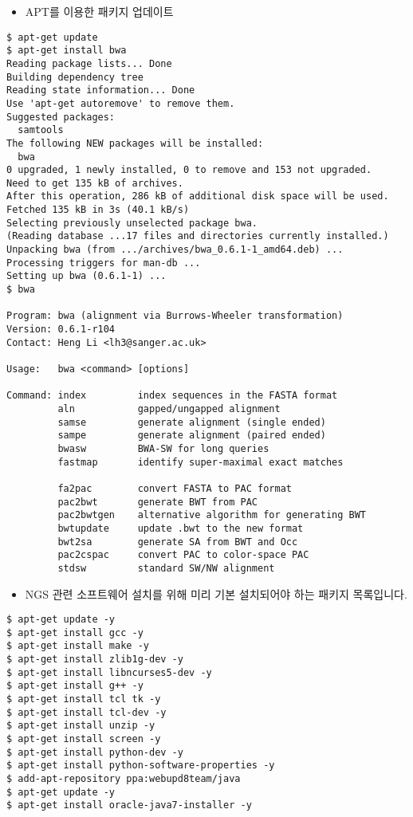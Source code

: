 \documentclass{article}
\begin{document}
\begin{itemize}
\item
  \begin{itemize}
  APT를 이용한 패키지 업데이트  
  \end{itemize}
\end{itemize}
\begin{lstlisting}[frame=single,style=Bash,xleftmargin=1.4cm,xrightmargin=1.4cm]
$ apt-get update
$ apt-get install bwa
Reading package lists... Done
Building dependency tree       
Reading state information... Done
Use 'apt-get autoremove' to remove them.
Suggested packages:
  samtools
The following NEW packages will be installed:
  bwa
0 upgraded, 1 newly installed, 0 to remove and 153 not upgraded.
Need to get 135 kB of archives.
After this operation, 286 kB of additional disk space will be used.
Fetched 135 kB in 3s (40.1 kB/s)
Selecting previously unselected package bwa.
(Reading database ...17 files and directories currently installed.)
Unpacking bwa (from .../archives/bwa_0.6.1-1_amd64.deb) ...
Processing triggers for man-db ...
Setting up bwa (0.6.1-1) ...
$ bwa

Program: bwa (alignment via Burrows-Wheeler transformation)
Version: 0.6.1-r104
Contact: Heng Li <lh3@sanger.ac.uk>

Usage:   bwa <command> [options]

Command: index         index sequences in the FASTA format
         aln           gapped/ungapped alignment
         samse         generate alignment (single ended)
         sampe         generate alignment (paired ended)
         bwasw         BWA-SW for long queries
         fastmap       identify super-maximal exact matches

         fa2pac        convert FASTA to PAC format
         pac2bwt       generate BWT from PAC
         pac2bwtgen    alternative algorithm for generating BWT
         bwtupdate     update .bwt to the new format
         bwt2sa        generate SA from BWT and Occ
         pac2cspac     convert PAC to color-space PAC
         stdsw         standard SW/NW alignment
\end{lstlisting}

\begin{itemize}
\item
  \begin{itemize}
  NGS 관련 소프트웨어 설치를 위해 미리 기본 설치되어야 하는 패키지 목록입니다.  
  \end{itemize}
\end{itemize}
\begin{lstlisting}[frame=single,style=Bash,xleftmargin=1.4cm,xrightmargin=1.4cm]
$ apt-get update -y
$ apt-get install gcc -y
$ apt-get install make -y
$ apt-get install zlib1g-dev -y
$ apt-get install libncurses5-dev -y
$ apt-get install g++ -y
$ apt-get install tcl tk -y
$ apt-get install tcl-dev -y
$ apt-get install unzip -y
$ apt-get install screen -y
$ apt-get install python-dev -y
$ apt-get install python-software-properties -y
$ add-apt-repository ppa:webupd8team/java
$ apt-get update -y
$ apt-get install oracle-java7-installer -y
\end{lstlisting}
\end{document}
